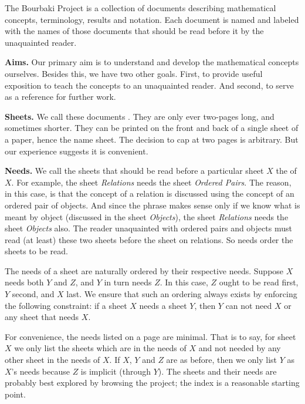 
The Bourbaki Project is a collection
of documents describing mathematical
concepts, terminology, results and
notation. Each document is named and
labeled with the names of those documents
that should be read before it by the
unaquainted reader.

\textbf{Aims.}
Our primary aim is to understand and
develop the mathematical concepts ourselves.
Besides this, we have two other goals.
First, to provide useful exposition to teach
the concepts to an unaquainted reader.
And second, to serve as a reference for
further work.

\textbf{Sheets.}
We call these documents .
They are only ever two-pages long, and
sometimes shorter.
They can be printed on the front
and back of a single
sheet of a paper, hence the name sheet.
The decision to cap at two pages is
arbitrary.
But our
experience suggests it is convenient.


\textbf{Needs.}
We call the sheets that should
be read before a particular sheet
$X$ the  of $X$.
For example, the sheet \textit{Relations}
needs the sheet \textit{Ordered Pairs}.
The reason, in this case, is that the
concept of a relation is discussed using
the concept of an ordered pair of objects.
And since the phrase
 makes sense
only if we know what is meant by object
(discussed in the sheet \textit{Objects}),
the sheet \textit{Relations} needs the sheet
\textit{Objects} also.
The reader unaquainted with
ordered pairs and
objects must read (at least) these two
sheets before the sheet on relations.
So needs order the sheets to be read.

The needs of a sheet are naturally
ordered by their respective needs.
Suppose $X$ needs both $Y$ and $Z$,
and
 $Y$ in turn needs $Z$.
In this case,
$Z$ ought to
be read first, $Y$ second, and $X$ last.
We ensure that such an ordering
always exists by enforcing
the following constraint:
if a
sheet $X$ needs a sheet $Y$,
then $Y$ can not need $X$ or any sheet
that needs $X$.

For convenience, the needs listed on
a page are minimal. That is to say,
for sheet $X$ we only list the sheets
which are in the needs of $X$
and not needed by any other sheet
in the needs of $X$.
If $X$, $Y$ and $Z$ are as before,
then we only list $Y$ as $X$'s needs
because $Z$ is implicit (through $Y$).
The sheets and their needs are probably
best explored by browsing the project;
the index is
a reasonable starting point.

